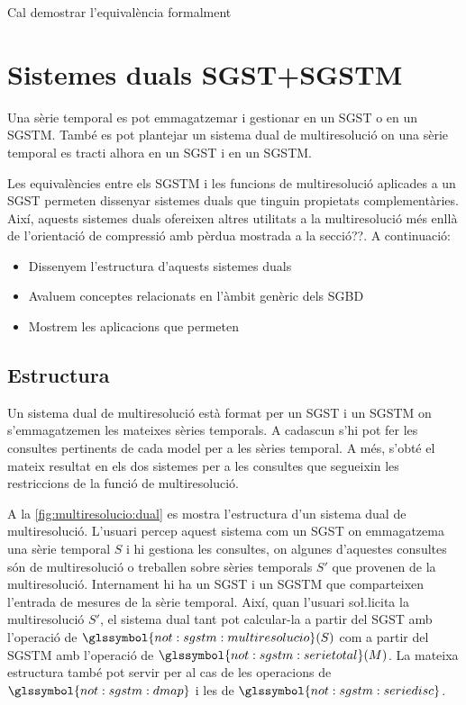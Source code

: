 Cal demostrar l'equivalència formalment\todo{}





\section{Sistemes duals SGST+SGSTM}
\label{sec:multiresolucio:dual}


Una sèrie temporal es pot emmagatzemar i gestionar en un \gls{SGST} o
en un \gls{SGSTM}. També es pot plantejar un sistema dual de
multiresolució on una sèrie temporal es tracti alhora en un \gls{SGST}
i en un \gls{SGSTM}.

Les equivalències entre els \gls{SGSTM} i les funcions de
multiresolució aplicades a un \gls{SGST} permeten dissenyar sistemes
duals que tinguin propietats complementàries.  Així, aquests sistemes
duals ofereixen altres utilitats a la multiresolució més enllà de
l'orientació de compressió amb pèrdua mostrada a la secció??. A continuació:
\begin{itemize}
\item Dissenyem l'estructura d'aquests sistemes duals
\item Avaluem conceptes relacionats en l'àmbit genèric dels \gls{SGBD}
\item Mostrem les aplicacions que permeten
\end{itemize}




\subsection{Estructura}

Un sistema dual de multiresolució està format per un \gls{SGST} i un
\gls{SGSTM} on s'emmagatzemen les mateixes sèries temporals. A
cadascun s'hi pot fer les consultes pertinents de cada model per a les
sèries temporal. A més, s'obté el mateix resultat en els dos sistemes
per a les consultes que segueixin les restriccions de la funció de
multiresolució.


A la \autoref{fig:multiresolucio:dual} es mostra l'estructura d'un
sistema dual de multiresolució. L'usuari percep aquest sistema com un
\gls{SGST} on emmagatzema una sèrie temporal $S$ i hi gestiona les
consultes, on algunes d'aquestes consultes són de multiresolució o
treballen sobre sèries temporals $S'$ que provenen de la
multiresolució.  Internament hi ha un \gls{SGST} i un \gls{SGSTM} que
comparteixen l'entrada de mesures de la sèrie temporal. Així, quan
l'usuari so\l.licita la multiresolució $S'$, el sistema dual tant pot
calcular-la a partir del \gls{SGST} amb l'operació de
$\glssymbol{not:sgstm:multiresolucio}(S)$ com a partir del \gls{SGSTM}
amb l'operació de $\glssymbol{not:sgstm:serietotal}(M)$.  La mateixa
estructura també pot servir per al cas de les operacions de
$\glssymbol{not:sgstm:dmap}$ i les de
$\glssymbol{not:sgstm:seriedisc}$.


